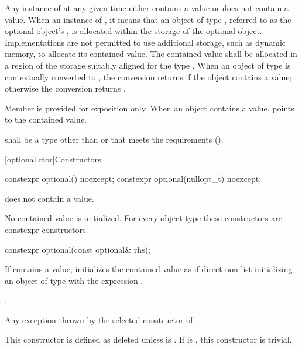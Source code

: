 \pnum
Any instance of  at any given time either contains a value or does not contain a value.
When an instance of  ,
it means that an object of type , referred to as the optional object's ,
is allocated within the storage of the optional object.
Implementations are not permitted to use additional storage, such as dynamic memory, to allocate its contained value.
The contained value shall be allocated in a region of the  storage suitably aligned for the type .
When an object of type  is contextually converted to ,
the conversion returns  if the object contains a value;
otherwise the conversion returns .

\pnum
Member  is provided for exposition only. When an  object contains a value,  points to the contained value.

\pnum
{} shall be a type
other than \cv{}  or \cv{} 
that meets the  requirements ().

[optional.ctor]{Constructors}

%
\begin{itemdecl}
constexpr optional() noexcept;
constexpr optional(nullopt_t) noexcept;
\end{itemdecl}

\begin{itemdescr}
\pnum
\ensures
{} does not contain a value.

\pnum
\remarks
No contained value is initialized.
For every object type  these constructors are constexpr constructors.
\end{itemdescr}

%
\begin{itemdecl}
constexpr optional(const optional& rhs);
\end{itemdecl}

\begin{itemdescr}
\pnum
\effects
If  contains a value, initializes the contained value as if
direct-non-list-initializing an object of type  with the expression .

\pnum
\ensures
{}.

\pnum
\throws
Any exception thrown by the selected constructor of .

\pnum
\remarks
This constructor is defined as deleted unless
 is .
If  is ,
this constructor is trivial.
\end{itemdescr}

